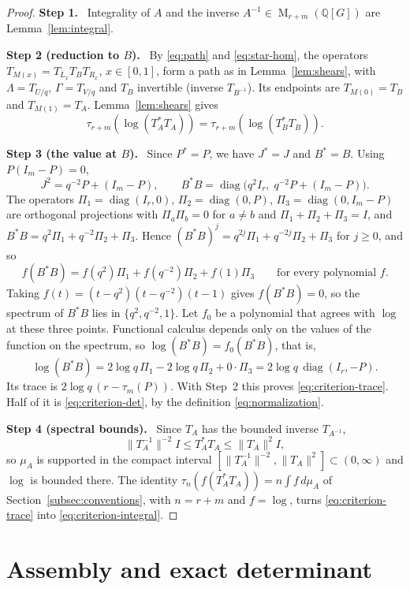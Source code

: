\documentclass[11pt]{article}
\theoremstyle{remark}
\numberwithin{equation}{section}
\newcommand{\Q}{\mathbb Q}
\newcommand{\Mat}{\operatorname{M}}
\newcommand{\diag}{\operatorname{diag}}
\newcommand{\step}[1]{\par\smallskip\noindent\textbf{Step #1.}\ }
\begin{document}
\begin{proof}
\step{1} Integrality of $A$ and the inverse $A^{-1}\in\Mat_{r+m}(\Q[G])$ are Lemma~\ref{lem:integral}.

\step{2 (reduction to $B$)} By \eqref{eq:path} and \eqref{eq:star-hom}, the operators $T_{M(x)}=T_{L_x}T_BT_{R_x}$, $x\in[0,1]$, form a path as in Lemma~\ref{lem:shears}, with $\Lambda=T_{U/q}$, $\Gamma=T_{V/q}$ and $T_B$ invertible (inverse $T_{B^{-1}}$). Its endpoints are $T_{M(0)}=T_B$ and $T_{M(1)}=T_A$. Lemma~\ref{lem:shears} gives
\[
 \tau_{r+m}(\log(T_A^*T_A))=\tau_{r+m}(\log(T_B^*T_B)).
\]

\step{3 (the value at $B$)} Since $P^*=P$, we have $J^*=J$ and $B^*=B$. Using $P(I_m-P)=0$,
\[
 J^2=q^{-2}P+(I_m-P),\qquad B^*B=\diag\bigl(q^2I_r,\;q^{-2}P+(I_m-P)\bigr).
\]
The operators $\Pi_1=\diag(I_r,0)$, $\Pi_2=\diag(0,P)$, $\Pi_3=\diag(0,I_m-P)$ are orthogonal projections with $\Pi_a\Pi_b=0$ for $a\ne b$ and $\Pi_1+\Pi_2+\Pi_3=I$, and $B^*B=q^2\Pi_1+q^{-2}\Pi_2+\Pi_3$. Hence $(B^*B)^j=q^{2j}\Pi_1+q^{-2j}\Pi_2+\Pi_3$ for $j\ge0$, and so
\[
 f(B^*B)=f(q^2)\Pi_1+f(q^{-2})\Pi_2+f(1)\Pi_3\qquad\text{for every polynomial }f .
\]
Taking $f(t)=(t-q^2)(t-q^{-2})(t-1)$ gives $f(B^*B)=0$, so the spectrum of $B^*B$ lies in $\{q^2,q^{-2},1\}$. Let $f_0$ be a polynomial that agrees with $\log$ at these three points. Functional calculus depends only on the values of the function on the spectrum, so $\log(B^*B)=f_0(B^*B)$, that is,
\[
 \log(B^*B)=2\log q\,\Pi_1-2\log q\,\Pi_2+0\cdot\Pi_3=2\log q\,\diag(I_r,-P).
\]
Its trace is $2\log q\,(r-\tau_m(P))$. With Step~2 this proves \eqref{eq:criterion-trace}. Half of it is \eqref{eq:criterion-det}, by the definition \eqref{eq:normalization}.

\step{4 (spectral bounds)} Since $T_A$ has the bounded inverse $T_{A^{-1}}$,
\[
 \|T_A^{-1}\|^{-2}I\le T_A^*T_A\le\|T_A\|^2I ,
\]
so $\mu_A$ is supported in the compact interval $[\|T_A^{-1}\|^{-2},\|T_A\|^2]\subset(0,\infty)$ and $\log$ is bounded there. The identity $\tau_n(f(T_A^*T_A))=n\int f\,d\mu_A$ of Section~\ref{subsec:conventions}, with $n=r+m$ and $f=\log$, turns \eqref{eq:criterion-trace} into \eqref{eq:criterion-integral}.
\end{proof}

\section{Assembly and exact determinant}
\label{sec:assembly}
\end{document}
